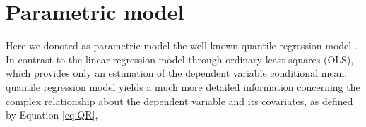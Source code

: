 \documentclass[a4paper]{IEEEtran}
\begin{document}
%
%
%



\section{Parametric model}
Here we donoted as parametric model the well-known quantile regression model \cite{koenker2005quantile}. In contrast to the linear regression model through ordinary least squares (OLS), which provides only an estimation of the dependent variable conditional mean, quantile regression model yields a much more detailed information concerning the complex relationship about the dependent variable and its covariates, as defined by Equation \eqref{eq:QR}, 
\end{document}
